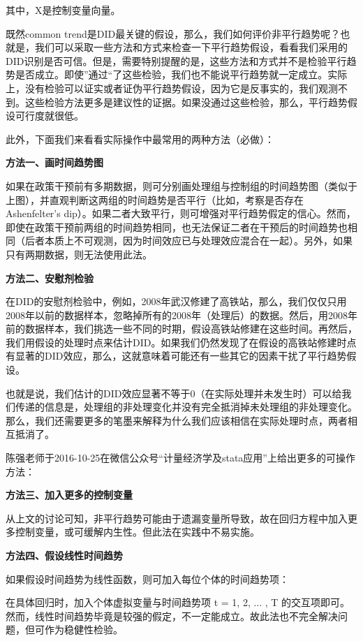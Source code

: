 \documentclass[cn,10pt,math=newtx,citestyle=gb7714-2015,bibstyle=gb7714-2015]{elegantbook}
\begin{document}
	其中，X是控制变量向量。
	
	既然common trend是DID最关键的假设，那么，我们如何评价非平行趋势呢？也就是，我们可以采取一些方法和方式来检查一下平行趋势假设，看看我们采用的DID识别是否可信。但是，需要特别提醒的是，这些方法和方式并不是检验平行趋势是否成立。即使”通过“了这些检验，我们也不能说平行趋势就一定成立。实际上，没有检验可以证实或者证伪平行趋势假设，因为它是反事实的，我们观测不到。这些检验方法更多是建议性的证据。如果没通过这些检验，那么，平行趋势假设可行度就很低。
	
	此外，下面我们来看看实际操作中最常用的两种方法（必做）：
	
	\textbf{方法一、画时间趋势图}
	
	如果在政策干预前有多期数据，则可分别画处理组与控制组的时间趋势图（类似于上图），并直观判断这两组的时间趋势是否平行（比如，考察是否存在Ashenfelter's dip）。如果二者大致平行，则可增强对平行趋势假定的信心。然而，即使在政策干预前两组的时间趋势相同，也无法保证二者在干预后的时间趋势也相同（后者本质上不可观测，因为时间效应已与处理效应混合在一起）。另外，如果只有两期数据，则无法使用此法。
	
	\textbf{方法二、安慰剂检验}
	
	在DID的安慰剂检验中，例如，2008年武汉修建了高铁站，那么，我们仅仅只用2008年以前的数据样本，忽略掉所有的2008年（处理后）的数据。然后，用2008年前的数据样本，我们挑选一些不同的时期，假设高铁站修建在这些时间。再然后，我们用假设的处理时点来估计DID。如果我们仍然发现了在假设的高铁站修建时点有显著的DID效应，那么，这就意味着可能还有一些其它的因素干扰了平行趋势假设。
	
	也就是说，我们估计的DID效应显著不等于0（在实际处理并未发生时）可以给我们传递的信息是，处理组的非处理变化并没有完全抵消掉未处理组的非处理变化。那么，我们还需要更多的笔墨来解释为什么我们应该相信在实际处理时点，两者相互抵消了。
	
	陈强老师于2016-10-25在微信公众号“计量经济学及stata应用”上给出更多的可操作方法：
	
	\textbf{方法三、加入更多的控制变量}
	
	从上文的讨论可知，非平行趋势可能由于遗漏变量所导致，故在回归方程中加入更多控制变量，或可缓解内生性。但此法在实践中不易实施。
	
	\textbf{方法四、假设线性时间趋势}
	
	如果假设时间趋势为线性函数，则可加入每位个体的时间趋势项：
	
	在具体回归时，加入个体虚拟变量与时间趋势项 t = 1, 2, ... , T 的交互项即可。然而，线性时间趋势毕竟是较强的假定，不一定能成立。故此法也不完全解决问题，但可作为稳健性检验。
	
\end{document}

